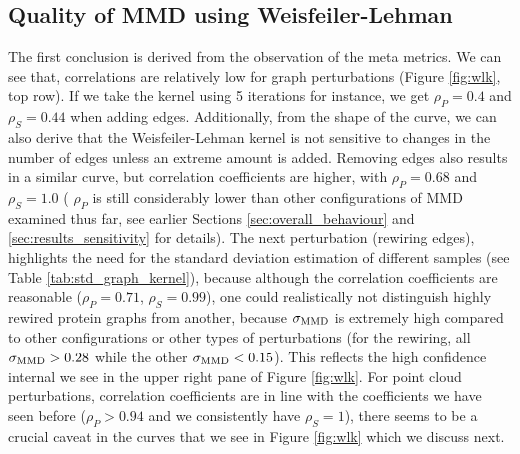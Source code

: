 \subsection{Quality of MMD using Weisfeiler-Lehman} The first conclusion is
derived from the observation of the meta metrics. We can see that, correlations
are relatively low for graph perturbations (Figure \ref{fig:wlk}, top row). If
we take the kernel using 5 iterations for instance, we get $\rho_P=0.4$ and
$\rho_S=0.44$ when adding edges. Additionally, from the shape of the curve, we
can also derive that the Weisfeiler-Lehman kernel is not sensitive to changes in
the number of edges unless an extreme amount is added. Removing edges also
results in a similar curve, but correlation coefficients are higher, with
$\rho_P=0.68$ and $\rho_S=1.0$ ( $\rho_P$ is still considerably lower than other
configurations of MMD examined thus far, see earlier Sections
\ref{sec:overall_behaviour} and \ref{sec:results_sensitivity} for details). The
next perturbation (rewiring edges), highlights the need for the standard
deviation estimation of different samples (see Table
\ref{tab:std_graph_kernel}), because although the correlation coefficients are
reasonable ($\rho_P=0.71$, $\rho_S=0.99$), one could realistically not
distinguish highly rewired protein graphs from another, because $\sigma_{\text{MMD}}$ is
extremely high compared to other configurations or other types of perturbations
(for the rewiring, all $\sigma_{\text{MMD}}>0.28$ while the other $\sigma_{\text{MMD}}<0.15$).
This reflects the high confidence internal we see in the upper right pane of
Figure \ref{fig:wlk}. For point cloud perturbations, correlation coefficients
are in line with the coefficients we have seen before ($\rho_P>0.94$ and we
consistently have $\rho_S=1$), there seems to be a crucial caveat in the curves
that we see in Figure \ref{fig:wlk} which we discuss next.

